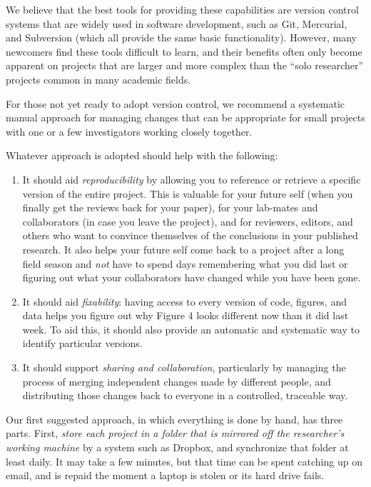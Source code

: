 \documentclass[10pt]{article}
\newcommand{\recommend}[1]{\textit{#1}}
\begin{document}
We believe that the best tools for providing these capabilities are
version control systems that are widely used in software development,
such as Git, Mercurial, and Subversion (which all provide the same basic
functionality). However, many newcomers find these tools difficult to
learn, and their benefits often only become apparent on projects that
are larger and more complex than the ``solo researcher'' projects common
in many academic fields.

For those not yet ready to adopt version control, we recommend a
systematic manual approach for managing changes that can be appropriate
for small projects with one or a few investigators working closely
together.

Whatever approach is adopted should help with the following:

\begin{enumerate}
\item
  It should aid \emph{reproducibility} by allowing you to reference or
  retrieve a specific version of the entire project. This is valuable
  for your future self (when you finally get the reviews back for your
  paper), for your lab-mates and collaborators (in case you leave the
  project), and for reviewers, editors, and others who want to convince
  themselves of the conclusions in your published research. It also
  helps your future self come back to a project after a long field
  season and \emph{not} have to spend days remembering what you did last
  or figuring out what your collaborators have changed while you have
  been gone.
\item
  It should aid \emph{fixability}: having access to every version of
  code, figures, and data helps you figure out why Figure 4 looks
  different now than it did last week.  To aid this, it should also
  provide an automatic and systematic way to identify particular
  versions.
\item
  It should support \emph{sharing and collaboration}, particularly by
  managing the process of merging independent changes made by different
  people, and distributing those changes back to everyone in a
  controlled, traceable way.
\end{enumerate}

Our first suggested approach, in which everything is done by hand, has
three parts. First, \recommend{store each project in a folder that is
  mirrored off the researcher's working machine} by a system such as
Dropbox, and synchronize that folder at least daily. It may take a few
minutes, but that time can be spent catching up on email, and is
repaid the moment a laptop is stolen or its hard drive fails.
\end{document}
